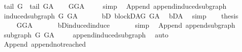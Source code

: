 \begin{isabellebody}
\ \ {\isachardoublequoteopen}tail\ G\ {\isacharequal}{\kern0pt}\ tail\ G{\isacharunderscore}{\kern0pt}A{\isachardoublequoteclose}\isanewline
%
\isadelimproof
\ \ %
\endisadelimproof
%
\isatagproof
{}\isamarkupfalse%
\ GG{\isacharunderscore}{\kern0pt}A\ \isanewline
\ \ \isamarkupfalse%
\ simp%
\endisatagproof
{\isafoldproof}%
%
\isadelimproof
\isanewline
%
\endisadelimproof
\isanewline
\isanewline
\isanewline
{}\isamarkupfalse%
\ {\isacharparenleft}{\kern0pt}\ Append{\isacharparenright}{\kern0pt}\ append{\isacharunderscore}{\kern0pt}induced{\isacharunderscore}{\kern0pt}subgraph{\isacharcolon}{\kern0pt}\ \isanewline
\ \ {\isachardoublequoteopen}induced{\isacharunderscore}{\kern0pt}subgraph\ G\ G{\isacharunderscore}{\kern0pt}A\ {\isachardoublequoteclose}\isanewline
%
\isadelimproof
%
\endisadelimproof
%
\isatagproof
{}\isamarkupfalse%
\ {\isacharminus}{\kern0pt}\isanewline
\ \ \isamarkupfalse%
\ bD{}{\isacharcolon}{\kern0pt}\ blockDAG\ G{\isacharunderscore}{\kern0pt}A\ \isamarkupfalse%
\ bD{\isacharunderscore}{\kern0pt}A\ \isamarkupfalse%
\ simp\isanewline
\ \ \isamarkupfalse%
\ {\isacharquery}{\kern0pt}thesis\ \isanewline
\ \ \ \ \isamarkupfalse%
\ GG{\isacharunderscore}{\kern0pt}A\ \isanewline
\ \ \ \ \isamarkupfalse%
\ bD{}{\isachardot}{\kern0pt}induced{\isacharunderscore}{\kern0pt}induce\ \isanewline
\ \ \ \ \isamarkupfalse%
\ simp\isanewline
{}\isamarkupfalse%
%
\endisatagproof
{\isafoldproof}%
%
\isadelimproof
\isanewline
%
\endisadelimproof
\isanewline
\isanewline
{}\isamarkupfalse%
\ {\isacharparenleft}{\kern0pt}\ Append{\isacharparenright}{\kern0pt}\ append{\isacharunderscore}{\kern0pt}subgraph{\isacharcolon}{\kern0pt}\ \isanewline
\ \ {\isachardoublequoteopen}subgraph\ G\ G{\isacharunderscore}{\kern0pt}A\ {\isachardoublequoteclose}\isanewline
%
\isadelimproof
\ \ %
\endisadelimproof
%
\isatagproof
{}\isamarkupfalse%
\ append{\isacharunderscore}{\kern0pt}induced{\isacharunderscore}{\kern0pt}subgraph\ \isamarkupfalse%
\ auto%
\endisatagproof
{\isafoldproof}%
%
\isadelimproof
\isanewline
%
\endisadelimproof
\isanewline
\isanewline
{}\isamarkupfalse%
\ {\isacharparenleft}{\kern0pt}\ Append{\isacharparenright}{\kern0pt}\ append{\isacharunderscore}{\kern0pt}not{\isacharunderscore}{\kern0pt}reached{\isacharcolon}{\kern0pt}\isanewline

\end{isabellebody}

